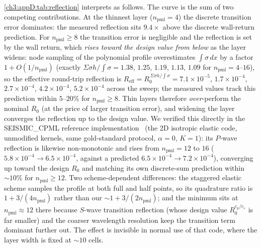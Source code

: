 \ref{ch3:appD:tab:reflection} interprets as follows.  The curve is
the sum of two competing contributions.  At the thinnest layer
($n_{\mathrm{pml}}=4$) the discrete transition error dominates: the
measured reflection sits $9.4\times$ above the discrete wall-return
prediction.  For $n_{\mathrm{pml}}\ge8$ the transition error is
negligible and the reflection is set by the wall return, which
\emph{rises toward the design value from below} as the layer widens:
node sampling of the polynomial profile overestimates
$\int\sigma\,dx$ by a factor $1+O(1/n_{\mathrm{pml}})$ (exactly
$\Sigma\sigma h/\!\int\!\sigma = 1.38$, $1.25$, $1.19$, $1.13$,
$1.09$ for $n_{\mathrm{pml}}=4$--$16$), so the effective round-trip
reflection is
$R_{\mathrm{eff}} = R_0^{\,\Sigma\sigma h/\!\int\!\sigma} =
7.1\times10^{-5}$, $1.7\times10^{-4}$, $2.7\times10^{-4}$,
$4.2\times10^{-4}$, $5.2\times10^{-4}$ across the sweep; the measured
values track this prediction within $5$--$20\%$ for
$n_{\mathrm{pml}}\ge8$.  Thin layers therefore \emph{over}-perform
the nominal $R_0$ (at the price of larger transition error), and
widening the layer converges the reflection up to the design value.
We verified this directly in the {\footnotesize SEISMIC\_CPML}
reference implementation~\cite{komatitsch2007unsplit} (the 2D
isotropic elastic code, unmodified kernels, same gold-standard
protocol, $\alpha=0$, $K=1$): its $P$-wave reflection is likewise
non-monotonic and rises from $n_{\mathrm{pml}}=12$ to $16$
($5.8\times10^{-4}\to6.5\times10^{-4}$, against a predicted
$6.5\times10^{-4}\to7.2\times10^{-4}$), converging up toward the
design $R_0$ and matching its own discrete-sum prediction within
${\sim}10\%$ for $n_{\mathrm{pml}}\ge12$.  Two scheme-dependent
differences: the staggered elastic scheme samples the profile at both
full and half points, so its quadrature ratio is
$1+3/(4n_{\mathrm{pml}})$ rather than our
${\sim}1+3/(2n_{\mathrm{pml}})$; and the minimum sits at
$n_{\mathrm{pml}}\approx12$ there because $S$-wave transition
reflection (whose design value $R_0^{c_p/c_s}$ is far smaller) and the
coarser wavelength resolution keep the transition term dominant
further out.  The effect is invisible in normal use of that code, where
the layer width is fixed at ${\sim}10$ cells.

